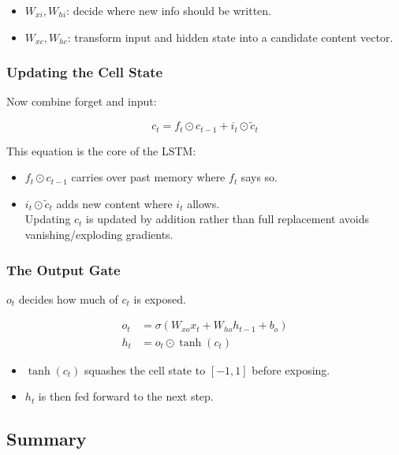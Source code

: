 \documentclass[
]{article}
\providecommand{\tightlist}{%
  \setlength{\itemsep}{0pt}\setlength{\parskip}{0pt}}
\begin{document}
\begin{itemize}
\tightlist
\item
  \(W_{xi}, W_{hi}\): decide where new info should be written.\\
\item
  \(W_{xc}, W_{hc}\): transform input and hidden state into a candidate
  content vector.
\end{itemize}

\subsubsection{Updating the Cell State}\label{updating-the-cell-state}

Now combine forget and input:

\[
c_t = f_t \odot c_{t-1} + i_t \odot \tilde{c}_t
\]

This equation is the core of the LSTM:

\begin{itemize}
\tightlist
\item
  \(f_t \odot c_{t-1}\) carries over past memory where \(f_t\) says
  so.\\
\item
  \(i_t \odot \tilde{c}_t\) adds new content where \(i_t\) allows.\\
  Updating \(c_t\) is updated by addition rather than full replacement
  avoids vanishing/exploding gradients.
\end{itemize}

\subsubsection{The Output Gate}\label{the-output-gate}

\(o_t\) decides how much of \(c_t\) is exposed.

\[
\begin{aligned}
o_t &= \sigma(W_{xo}x_t + W_{ho}h_{t-1} + b_o) \\
h_t &= o_t \odot \tanh(c_t)
\end{aligned}
\]

\begin{itemize}
\tightlist
\item
  \(\tanh(c_t)\) squashes the cell state to \([-1,1]\) before
  exposing.\\
\item
  \(h_t\) is then fed forward to the next step.
\end{itemize}

\subsection{Summary}\label{summary}
\end{document}
